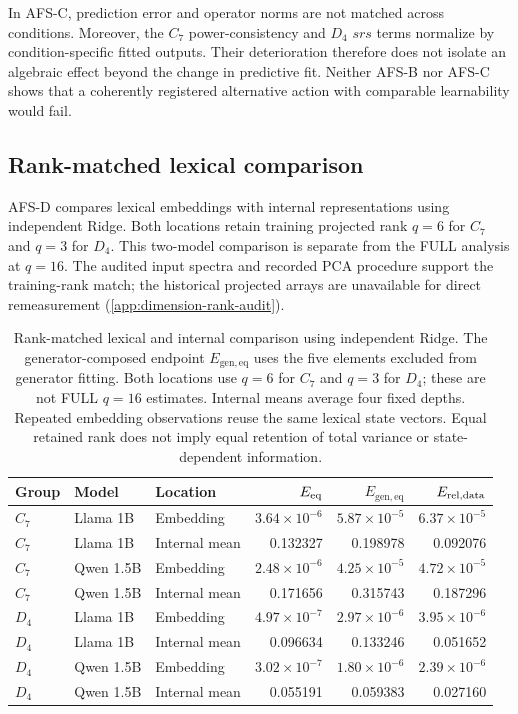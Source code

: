 In AFS-C, prediction error and operator norms are not
matched across conditions.
Moreover, the $C_7$ power-consistency and $D_4$ $srs$
terms normalize by condition-specific fitted outputs.
Their deterioration therefore does not isolate an
algebraic effect beyond the change in predictive fit.
Neither AFS-B nor AFS-C shows that a coherently registered
alternative action with comparable learnability
would fail.


\subsection{Rank-matched lexical comparison}

AFS-D compares lexical embeddings with internal
representations using independent Ridge.
Both locations retain training projected rank $q=6$
for $C_7$ and $q=3$ for $D_4$.
This two-model comparison is separate from the FULL
analysis at $q=16$.
The audited input spectra and recorded PCA procedure
support the training-rank match; the historical projected
arrays are unavailable for direct remeasurement
(\cref{app:dimension-rank-audit}).

\begin{table}[t]
\caption{
Rank-matched lexical and internal comparison using
independent Ridge.
The generator-composed endpoint $E_{\mathrm{gen,eq}}$
uses the five elements excluded from generator fitting.
Both locations use $q=6$ for $C_7$ and $q=3$ for $D_4$;
these are not FULL $q=16$ estimates.
Internal means average four fixed depths.
Repeated embedding observations reuse the same lexical
state vectors.
Equal retained rank does not imply equal retention
of total variance or state-dependent information.
}
\label{tab:lexical-control}
\centering
\small
\begin{tabular}{lllrrr}
\toprule
Group & Model & Location
& $E_{\mathrm{eq}}$ & $E_{\mathrm{gen,eq}}$ & $E_{\mathrm{rel,data}}$ \\
\midrule
$C_7$ & Llama 1B & Embedding
& $3.64\!\times\!10^{-6}$
& $5.87\!\times\!10^{-5}$
& $6.37\!\times\!10^{-5}$ \\
$C_7$ & Llama 1B & Internal mean
& 0.132327 & 0.198978 & 0.092076 \\
$C_7$ & Qwen 1.5B & Embedding
& $2.48\!\times\!10^{-6}$
& $4.25\!\times\!10^{-5}$
& $4.72\!\times\!10^{-5}$ \\
$C_7$ & Qwen 1.5B & Internal mean
& 0.171656 & 0.315743 & 0.187296 \\
\midrule
$D_4$ & Llama 1B & Embedding
& $4.97\!\times\!10^{-7}$
& $2.97\!\times\!10^{-6}$
& $3.95\!\times\!10^{-6}$ \\
$D_4$ & Llama 1B & Internal mean
& 0.096634 & 0.133246 & 0.051652 \\
$D_4$ & Qwen 1.5B & Embedding
& $3.02\!\times\!10^{-7}$
& $1.80\!\times\!10^{-6}$
& $2.39\!\times\!10^{-6}$ \\
$D_4$ & Qwen 1.5B & Internal mean
& 0.055191 & 0.059383 & 0.027160 \\
\bottomrule
\end{tabular}
\end{table}

